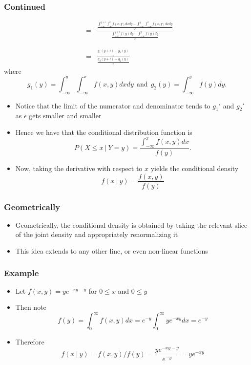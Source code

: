 \documentclass[aspectratio=169]{beamer}
\begin{document}
\begin{frame}
\frametitle{Continued}
\begin{eqnarray*}
& = & \frac{\frac{\int_{-\infty}^{y+\epsilon}\int_{\infty}^{x}f(x,y)dxdy - 
                  \int_{-\infty}^{y}\int_{-\infty}^{x}f(x,y)dxdy}{\epsilon}}
{\frac{\int_{-\infty}^{y+\epsilon} f(y) dy - \int_{-\infty}^{y} f(y) dy}{\epsilon}}\\ \\ \\
& = & \frac{\frac{g_1(y + \epsilon) - g_1(y)}{\epsilon}}{\frac{g_2(y + \epsilon) - g_2(y)}{\epsilon}}
\end{eqnarray*}
where
$$
g_1(y) = \int_{-\infty}^{y}\int_{-\infty}^{x}f(x,y)dxdy ~~\mbox{and}~~ 
g_2(y) = \int_{-\infty}^{y} f(y) dy.
$$
\end{frame}


\begin{frame}
\begin{itemize}
\item Notice that the limit of the numerator and denominator tends to
  $g_1'$ and $g_2'$ as $\epsilon$ gets smaller and smaller
\item Hence we have that the conditional distribution function is
$$
P(X \leq x ~|~ Y = y) = \frac{\int_{-\infty}^x f(x, y)dx}{f(y)}.
$$
\item Now, taking the derivative with respect to $x$ yields the
  conditional density
$$
f(x ~|~ y) = \frac{f(x, y)}{f(y)}
$$
\end{itemize}
\end{frame}

\begin{frame}\frametitle{Geometrically}
\begin{itemize}
\item Geometrically, the conditional density is obtained by taking the
  relevant slice of the joint density and appropriately renormalizing it
\item This idea extends to any other line, or even non-linear functions
\end{itemize}
\end{frame}

\begin{frame}\frametitle{Example}
\begin{itemize}
\item Let $f(x, y) = ye^{-xy - y}$ for $0 \leq x$ and $0 \leq y$
\item Then note
$$
f(y) = \int_{0}^\infty f(x, y)dx = e^{-y}\int_{0}^\infty ye^{-xy}dx = e^{-y}
$$
\item Therefore
$$
f(x~|~ y) = f(x, y) / f(y) = \frac{ ye^{-xy - y}}{e^{-y}} = ye^{-xy}
$$
\end{itemize}
\end{frame}
\end{document}
